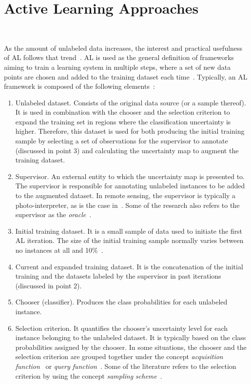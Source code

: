 \documentclass[remotesensing,article,submit,moreauthors,pdftex]{Definitions/mdpi}
\begin{document}
\section{Active Learning Approaches}~\label{sec:al-sota}

As the amount of unlabeled data increases, the interest and practical
usefulness of AL follows that trend~\cite{Kottke2017}. AL is used as the
general definition of frameworks aiming to train a learning system in multiple
steps, where a set of new data points are chosen and added to the training
dataset each time~\cite{Ruzicka2020}. Typically, an AL framework is composed
of the following elements~\cite{Sverchkov2017,Su2020,Ruzicka2020}:

\begin{enumerate}
    \item Unlabeled dataset. Consists of the original data source (or a sample
        thereof). It is used in combination with the chooser and the selection
        criterion to expand the training set in regions where the
        classification uncertainty is higher. Therefore, this dataset is used
        for both producing the initial training sample by selecting a set of
        observations for the supervisor to annotate (discussed in point 3) and
        calculating the uncertainty map to augment the training dataset.
    \item Supervisor. An external entity to which the uncertainty map is
        presented to. The supervisor is responsible for annotating unlabeled
        instances to be added to the augmented dataset. In remote sensing, the
        supervisor is typically a photo-interpreter, as is the case
        in~\cite{li2020}. Some of the research also refers to the supervisor
        as the \textit{oracle}~\cite{Ruzicka2020, Yoo2019, Aghdam2019,
        Cawley2011}.
    \item Initial training dataset. It is a small sample of data used to
        initiate the first AL iteration. The size of the initial training
        sample normally varies between no instances at all and
        10\%~\cite{Li2013}.
    \item Current and expanded training dataset. It is the concatenation of
        the initial training and the datasets labeled by the supervisor in
        past iterations (discussed in point 2).
    \item Chooser (classifier). Produces the class probabilities for each
        unlabeled instance.
    \item Selection criterion. It quantifies the chooser's uncertainty level
        for each instance belonging to the unlabeled dataset. It is typically
        based on the class probabilities assigned by the chooser. In some
        situations, the chooser and the selection criterion are grouped
        together under the concept \textit{acquisition
        function}~\cite{Ruzicka2020} or \textit{query function}~\cite{Su2020}.
        Some of the literature refers to the selection criterion by using the
        concept \textit{sampling scheme}~\cite{Liu2020}.
\end{enumerate}
\end{document}
